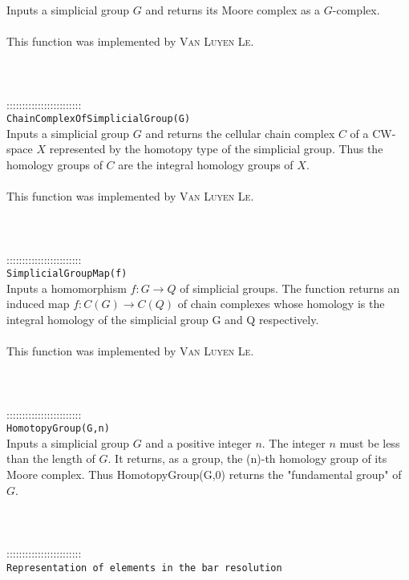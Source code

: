 \documentclass[a4paper,11pt]{report}
\begin{document}
{ Inputs a simplicial group $G$ and returns its Moore complex as a $G$-complex. \\
 \\
 This function was implemented by \textsc{Van Luyen Le}. \\
 \\
 \\
 \\
 ::::::::::::::::::::::::\\
 \texttt{ChainComplexOfSimplicialGroup(G)}\\
 

 Inputs a simplicial group $G$ and returns the cellular chain complex $C$ of a CW-space $X$ represented by the homotopy type of the simplicial group. Thus the homology
groups of $C$ are the integral homology groups of $X$. \\
 \\
 This function was implemented by \textsc{Van Luyen Le}. \\
 \\
 \\
 \\
 ::::::::::::::::::::::::\\
 \texttt{SimplicialGroupMap(f)}\\
 

 Inputs a homomorphism $f:G\rightarrow Q$ of simplicial groups. The function returns an induced map $f:C(G) \rightarrow C(Q)$ of chain complexes whose homology is the integral homology of the simplicial
group G and Q respectively. \\
 \\
 This function was implemented by \textsc{Van Luyen Le}. \\
 \\
 \\
 \\
 ::::::::::::::::::::::::\\
 \texttt{HomotopyGroup(G,n)}\\
 

 Inputs a simplicial group $G$ and a positive integer $n$. The integer $n$ must be less than the length of $G$. It returns, as a group, the (n)-th homology group of its Moore complex. Thus
HomotopyGroup(G,0) returns the "fundamental group" of $G$. \\
 \\
 \\
 \\
 ::::::::::::::::::::::::\\
 \texttt{Representation of elements in the bar resolution}\\
 

}
\end{document}
